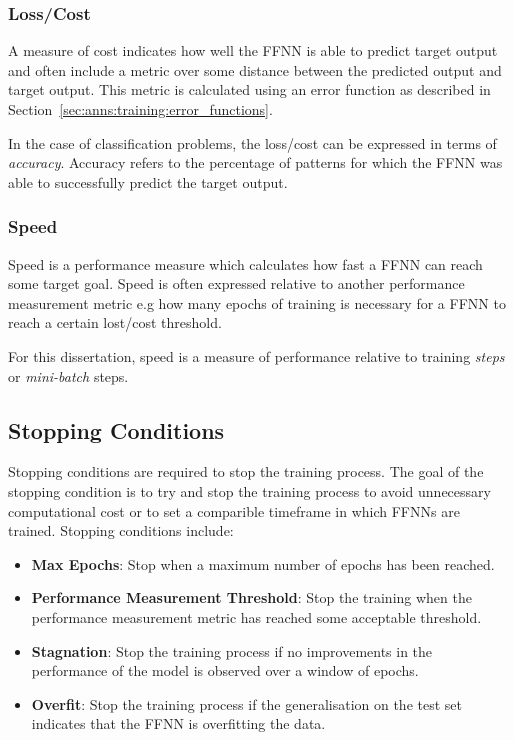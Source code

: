 \subsubsection{Loss/Cost}
\label{sec:anns:training:performance_measure:loss_cost}

A measure of cost indicates how well the \ac{FFNN} is able to predict target
output and often include a metric over some distance between the predicted
output and target output. This metric is calculated using an error function as
described in Section~\ref{sec:anns:training:error_functions}.

In the case of classification problems, the loss/cost can be expressed in terms
of \textit{accuracy}. Accuracy refers to the percentage of patterns for which
the \ac{FFNN} was able to successfully predict the target output. 

\subsubsection{Speed}
\label{sec:anns:training:performance_measure:speed}

Speed is a performance measure which calculates how fast a \ac{FFNN} can reach
some target goal. Speed is often expressed relative to another performance
measurement metric e.g how many epochs of training is necessary for a \ac{FFNN}
to reach a certain lost/cost threshold.

For this dissertation, speed is a measure of performance relative to training
\textit{steps} or \textit{mini-batch} steps.


\subsection{Stopping Conditions}
\label{sec:anns:training:stopping_conditions}

Stopping conditions are required to stop the training process. The goal of the
stopping condition is to try and stop the training process to avoid unnecessary
computational cost or to set a comparible timeframe in which \acp{FFNN} are
trained. Stopping conditions include:

\begin{itemize}
    \item
    \textbf{Max Epochs}: Stop when a maximum number of epochs has been reached.

    \item
    \textbf{Performance Measurement Threshold}: Stop the training when the
    performance measurement metric has reached some acceptable threshold.

    \item
    \textbf{Stagnation}: Stop the training process if no improvements in the
    performance of the model is observed over a window of epochs.

    \item
    \textbf{Overfit}: Stop the training process if the generalisation on the
    test set indicates that the \ac{FFNN} is overfitting the data.
\end{itemize}


